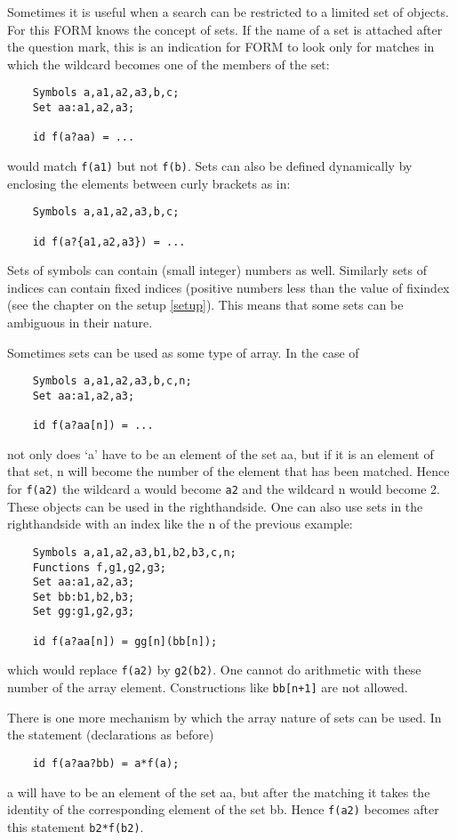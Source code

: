 Sometimes it is useful when a search can be restricted to a limited set of 
objects. For this FORM knows the concept of sets. If the name of 
a set is attached after the question mark, this is an indication for FORM 
to look only for matches in which the wildcard becomes one of the members 
of the set:
\begin{verbatim}
    Symbols a,a1,a2,a3,b,c;
    Set aa:a1,a2,a3;

    id f(a?aa) = ...
\end{verbatim}
would match \verb:f(a1): but not \verb:f(b):. Sets can also be defined 
dynamically by enclosing the elements between curly 
brackets as in:
\begin{verbatim}
    Symbols a,a1,a2,a3,b,c;

    id f(a?{a1,a2,a3}) = ...
\end{verbatim}
Sets of symbols can contain (small integer) numbers 
as well. Similarly sets of indices can contain fixed 
indices (positive numbers less than the value of fixindex 
(see the chapter on the setup \ref{setup}). This means that some sets can 
be ambiguous in their nature.

Sometimes sets can be used as some type of 
array. In the case of
\begin{verbatim}
    Symbols a,a1,a2,a3,b,c,n;
    Set aa:a1,a2,a3;

    id f(a?aa[n]) = ...
\end{verbatim}
not only does `a' have to be an element of the set aa, but if it is an 
element of that set, n will become the number of the element that has been 
matched. Hence for \verb:f(a2): the wildcard a would become \verb:a2: and 
the wildcard n would become 2. These objects can be used in the 
righthandside. One can also use sets in the righthandside with an index 
like the n of the previous example:
\begin{verbatim}
    Symbols a,a1,a2,a3,b1,b2,b3,c,n;
    Functions f,g1,g2,g3;
    Set aa:a1,a2,a3;
    Set bb:b1,b2,b3;
    Set gg:g1,g2,g3;

    id f(a?aa[n]) = gg[n](bb[n]);
\end{verbatim}
which would replace \verb:f(a2): by \verb:g2(b2):. One cannot do 
arithmetic with these number of the array element. 
Constructions like \verb:bb[n+1]: are not allowed.

There is one more mechanism by which the array nature of sets can be used. 
In the statement (declarations as before)
\begin{verbatim}
    id f(a?aa?bb) = a*f(a);
\end{verbatim}
a will have to be an element of the set aa, but after the matching it takes 
the identity of the corresponding element of 
the set bb. Hence \verb:f(a2): becomes after this statement 
\verb:b2*f(b2):.


